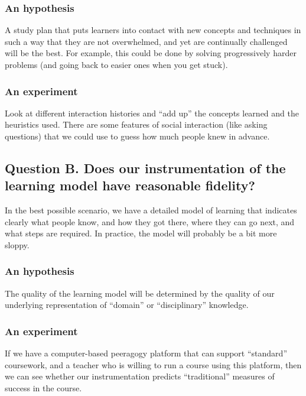 \subsubsection{An hypothesis}

A study plan that puts learners into contact with new concepts and
techniques in such a way that they are not overwhelmed, and yet are
continually challenged will be the best. For example, this could be done
by solving progressively harder problems (and going back to easier ones
when you get stuck).

\subsubsection{An experiment}

Look at different interaction histories and ``add up'' the concepts
learned and the heuristics used. There are some features of social
interaction (like asking questions) that we could use to guess how much
people knew in advance.

\subsection{Question B. Does our instrumentation of the learning model
have reasonable fidelity?}

In the best possible scenario, we have a detailed model of learning that
indicates clearly what people know, and how they got there, where they
can go next, and what steps are required. In practice, the model will
probably be a bit more sloppy.

\subsubsection{An hypothesis}

The quality of the learning model will be determined by the quality of
our underlying representation of ``domain'' or ``disciplinary''
knowledge.

\subsubsection{An experiment}

If we have a computer-based peeragogy platform that can support
``standard'' coursework, and a teacher who is willing to run a course
using this platform, then we can see whether our instrumentation
predicts ``traditional'' measures of success in the course.

